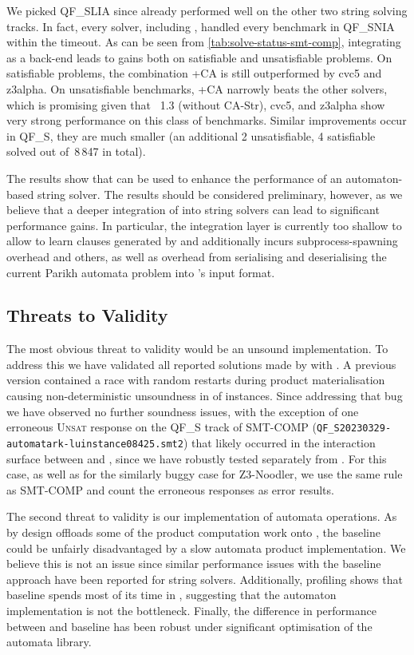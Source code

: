 We picked QF\_SLIA since
\Ostrich{} already performed well on the other two string solving tracks. In fact,
every solver, including \Ostrich{}, handled every benchmark in QF\_SNIA within the timeout.
%
As can be seen from \cref{tab:solve-status-smt-comp}, integrating \Catra{} as a back-end
leads to gains both on satisfiable and unsatisfiable problems. On
satisfiable problems, the combination \Ostrich+CA is still
outperformed by cvc5 and z3alpha. On unsatisfiable benchmarks,
\Ostrich+CA narrowly beats the other solvers,
which is promising given that \Ostrich{}~1.3 (without CA-Str), cvc5, and z3alpha show very strong
performance on this class of benchmarks. Similar improvements
occur in QF\_S, they are much smaller (an additional 2 unsatisfiable, 4 satisfiable 
solved out of~8\,847 in total).

The results show that \Calculus{} can be used to enhance the performance of an
automaton-based string solver. The results should be considered preliminary,
however, as we believe that a deeper integration of \Catra{} into string solvers
can lead to significant performance gains. In particular, the integration layer 
is currently too shallow to allow \Ostrich{} to learn clauses generated by \Catra{}
and additionally incurs subprocess-spawning overhead and others, as well as overhead
from serialising and deserialising the current Parikh automata problem into \Catra{}'s
input format.

\subsection{Threats to Validity}

The most obvious threat to validity would be an unsound implementation. To
address this we have validated all reported solutions made by \Calculus{} with
\Nuxmv{}. A previous version contained a race with random restarts during
product materialisation causing non-deterministic unsoundness in 
of instances. Since addressing that bug we have observed no further soundness
issues, with the exception of one erroneous \textsc{Unsat} response on the QF\_S track of 
SMT-COMP (\texttt{QF\_S\/20230329-automatark-lu\/instance08425.smt2}) that likely occurred
in the interaction surface between \Ostrich{} and \Catra{}, since we have robustly tested 
\Catra{} separately from \Ostrich{}. For this case, as well as for the similarly buggy case
for Z3-Noodler, we use the same rule as SMT-COMP and count the erroneous responses as error
results.

The second threat to validity is our implementation of automata operations. As
\Calculus{} by design offloads some of the product computation work onto
\Princess{}, the baseline could be unfairly disadvantaged by a slow automata
product implementation. We believe this is not an issue since similar
performance issues with the baseline approach have been reported for string
solvers. Additionally, profiling shows that baseline spends most of its time in
\Princess{}, suggesting that the automaton implementation is not the bottleneck.
Finally, the difference in performance between \Calculus{} and baseline has been
robust under significant optimisation of the automata library.

